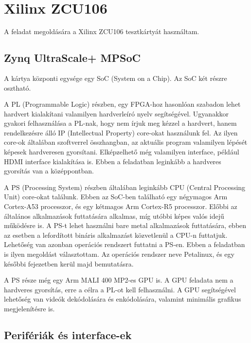 \chapter{Xilinx ZCU106}
A feladat megoldására a Xilinx ZCU106 tesztkártyát használtam.\cite{ZCU106}

\section{Zynq UltraScale+ MPSoC}
A kártya központi egysége egy SoC (System on a Chip). Az SoC két részre osztható.

A PL (Programmable Logic) részben, egy FPGA-hoz hasonlóan szabadon lehet hardvert kialakítani valamilyen hardverleíró nyelv segítségével. Ugyanakkor gyakori felhasználása a PL-nak, hogy nem írjuk meg kézzel a hardvert, hanem rendelkezésre álló IP (Intellectual Property) core-okat használunk fel. Az ilyen core-ok általában szoftverrel összhangban, az aktuális program valamilyen lépését képesek hardveresen gyorsítani. Elképzelhető még valamilyen interface, például HDMI interface kialakítása is. Ebben a feladatban leginkább a hardveres gyorsítás van a középpontban.

A PS (Processing System) részben általában leginkább CPU (Central Processing Unit) core-okat találunk. Ebben az SoC-ben található egy négymagos Arm Cortex-A53 processzor, és egy kétmagos Arm Cortex-R5 processzor. Előbbi az általános alkalmazások futtatására alkalmas, míg utóbbi képes valós idejű működésre is. A PS-t lehet használni bare metal alkalmazások futtatására, ebben az esetben a lefordított bináris alkalmazást közvetlenül a CPU-n futtatjuk. Lehetőség van azonban operációs rendszert futtatni a PS-en. Ebben a feladatban is ilyen megoldást választottam. Az operációs rendszer neve Petalinux, és egy későbbi fejezetben kerül majd bemutatásra.

A PS része még egy Arm MALI 400 MP2-es GPU is. A GPU feladata nem a hardveres gyorsítás, erre a célra a PL-ot kell felhasználni. A GPU segítségével lehetőség van videók dekódolására és enkódolására, valamint minimális grafikus megjelenítésre is.

\section{Perifériák és interface-ek}
